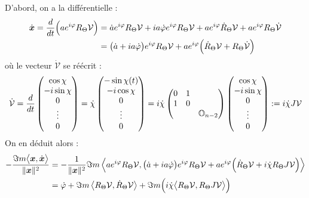 \begin{demo}
	D'abord, on a la différentielle :
	\begin{align*}
		\dot{\bf{x}} = \frac{d}{dt}\Big(a e^{i\varphi}R_{\Theta} \mathcal{V}\Big) &= \dot{a}e^{i\varphi}R_{\Theta} \mathcal{V} + ia\dot{\varphi}e^{i\varphi} R_{\Theta} \mathcal{V} + ae^{i\varphi}\dot{R}_{\Theta}\mathcal{V} + ae^{i\varphi}R_\Theta\dot{\mathcal{V}} \\
		&= \big(\dot{a} + ia\dot{\varphi}\big)e^{i\varphi}R_{\Theta} \mathcal{V} + ae^{i\varphi}\Big(\dot{R}_{\Theta}\mathcal{V} + R_\Theta\dot{\mathcal{V}}\Big)
	\end{align*}
	où le vecteur $\dot{\mathcal{V}}$ se réécrit :
	\begin{align*}
		\dot{\mathcal{V}} = \frac{d}{dt}\begin{pmatrix}
			\cos\chi \\ -i\sin\chi \\ 0 \\ \vdots \\ 0 
		\end{pmatrix} = \dot{\chi}\begin{pmatrix}
			-\sin\chi(t) \\ -i\cos\chi \\ 0 \\ \vdots \\ 0 
		\end{pmatrix} = i \dot{\chi} \begin{pmatrix}
			0 & 1 \\ 1 & 0 \\ & & \mathbb{O}_{n-2}
		\end{pmatrix}\begin{pmatrix} 
			\cos\chi \\ -i\sin\chi \\ 0 \\ \vdots \\ 0 
		\end{pmatrix} \defeq i\dot{\chi}J\mathcal{V}
	\end{align*}
	On en déduit alors :
	\begin{align*}
		-\frac{\Im m\big\langle \bf{x},\dot{\bf{x}}\big\rangle}{\|\bf{x}\|^2} &= -\frac{1}{\|\bf{x}\|^2}\Im m \left\langle ae^{i\varphi}R_\Theta \mathcal{V},  \big(\dot{a} + ia\dot{\varphi}\big)e^{i\varphi}R_{\Theta} \mathcal{V} + ae^{i\varphi}\Big(\dot{R}_{\Theta}\mathcal{V} + i\dot{\chi}R_\Theta J\mathcal{V}\Big)\right\rangle \\
		&= \dot{\varphi} + \Im m \left\langle R_\Theta \mathcal{V},   \dot{R}_{\Theta}\mathcal{V}\right\rangle + \Im m \Big( i\dot{\chi} \big\langle R_\Theta \mathcal{V}, R_\Theta J\mathcal{V}\big\rangle \Big) \\

\end{align*}
\end{demo}
